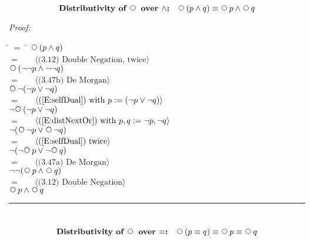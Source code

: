 \documentclass[fleqn, leqno]{article}
\newcommand{\lgap}{2pt} %
\newcommand{\mymathindent}{24pt} %
\newcommand{\Next}{\;\,\text{\raisebox{3.5pt}{\circle{6}}}}
\newcommand{\myqed}{\hfill\rule[-.23ex]{1.2ex}{2.0ex}}
\newcommand{\Gll} {\langle} %
\newcommand{\Ggg} {\rangle} %
\newcommand{\Hint}[1] {\ \ \ $\Gll \mbox{#1} \Ggg$ } %
\begin{document}
\begin{equation}\label{E:distNextAnd}
\textbf{Distributivity of $\Next$ over $\land$:}\quad \Next (p \land q) \equiv \Next p \land \Next q
\end{equation}


\emph{Proof:}
\begin{tabbing}
\hspace{\mymathindent} \= $= \;$ \= \kill
\> \> $\Next (p \land q)$\\[\lgap]
\> $=$ \> \Hint{(3.12) Double Negation, twice}\\[\lgap]
\> \> $\Next (\lnot\lnot p \land \lnot\lnot q)$\\[\lgap]
\> $=$ \> \Hint{(3.47b) De Morgan}\\[\lgap]
\> \> $\Next\lnot(\lnot p \lor \lnot q)$\\[\lgap]
\> $=$ \> \Hint{(\ref{E:selfDual}) with $p:= (\lnot p \lor \lnot q$)}\\[\lgap]
\> \> $\lnot\Next (\lnot p \lor \lnot q)$\\[\lgap]
\> $=$ \> \Hint{(\ref{E:distNextOr}) with $p,q := \lnot p, \lnot q$}\\[\lgap]
\> \> $\lnot (\Next\lnot p \lor \Next \lnot q)$\\[\lgap]
\> $=$ \> \Hint{(\ref{E:selfDual}) twice}\\[\lgap]
\> \> $\lnot(\lnot\Next p \lor \lnot\Next q)$\\[\lgap]
\> $=$ \> \Hint{(3.47a) De Morgan}\\[\lgap]
\> \> $\lnot\lnot(\Next p \land \Next q)$\\[\lgap]
\> $=$ \> \Hint{(3.12) Double Negation}\\[\lgap]
\> \> $\Next p \land \Next q$\\[\lgap]
\end{tabbing}
\myqed\\[\lgap]


\begin{equation}\label{E:distNextEquiv}
\textbf{Distributivity of $\Next$ over $\equiv$:}\quad \Next (p \equiv q) \equiv \Next p \equiv \Next q
\end{equation}
\end{document}
